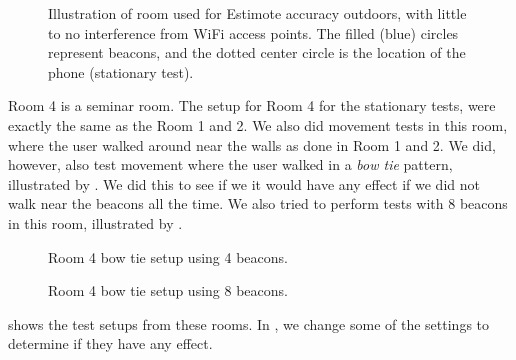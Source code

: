 \begin{figure}[!htb]
  \centering
  
  \caption{Illustration of room used for Estimote accuracy outdoors, with little to no interference from WiFi access points. The filled (blue) circles represent beacons, and the dotted center circle is the location of the phone (stationary test).}
  \label{fig:outdoortest}
\end{figure}

Room 4 is a seminar room. 
The setup for Room 4 for the stationary tests,
were exactly the same as the Room 1 and 2. 
We also did movement tests in this room, 
where the user walked around near the walls as done in Room 1 and 2. 
We did, however, also test movement where the user walked in a \emph{bow tie} pattern,
illustrated by . 
We did this to see if we it would have any effect if we did not walk near the beacons all the time. 
We also tried to perform tests with \num{8} beacons in this room, 
illustrated by . 

\begin{figure}[!htb]
  \begin{minipage}[b]{0.45\textwidth}
    \centering
    
    \caption{Room 4 bow tie setup using \num{4} beacons.}
    \label{fig:bowtie4beacons}
  \end{minipage}\hfill
  \begin{minipage}[b]{0.45\textwidth}
    \centering
    
    \caption{Room 4 bow tie setup using \num{8} beacons.}
    \label{fig:bowtie8beacons}
  \end{minipage}
\end{figure}

 shows the test setups from these rooms.
In , we change some of the settings to determine if they have any effect.

